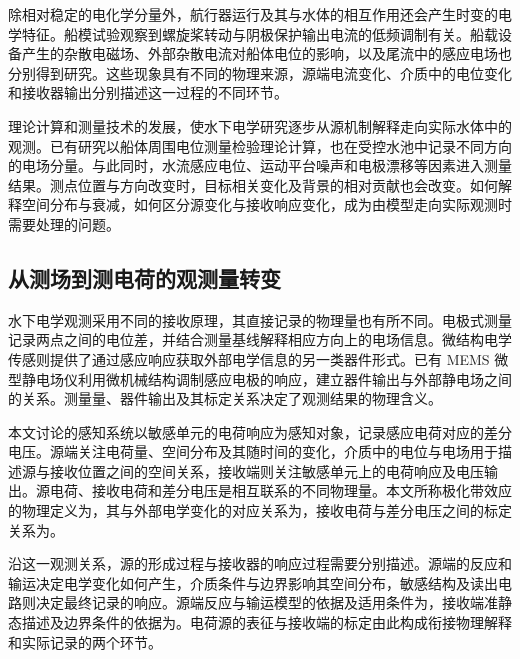除相对稳定的电化学分量外，航行器运行及其与水体的相互作用还会产生时变的电学特征。船模试验观察到螺旋桨转动与阴极保护输出电流的低频调制有关\cite{akomah2002}。船载设备产生的杂散电磁场、外部杂散电流对船体电位的影响，以及尾流中的感应电场也分别得到研究\cite{yang2006,wang2017stray,chen2024wake}。这些现象具有不同的物理来源，源端电流变化、介质中的电位变化和接收器输出分别描述这一过程的不同环节。

理论计算和测量技术的发展，使水下电学研究逐步从源机制解释走向实际水体中的观测。已有研究以船体周围电位测量检验理论计算，也在受控水池中记录不同方向的电场分量\cite{zamani1988,jiang2024}。与此同时，水流感应电位、运动平台噪声和电极漂移等因素进入测量结果\cite{crona2001,liu2022motion,wang2025agcl}。测点位置与方向改变时，目标相关变化及背景的相对贡献也会改变。如何解释空间分布与衰减，如何区分源变化与接收响应变化，成为由模型走向实际观测时需要处理的问题。

\subsection{从测场到测电荷的观测量转变}

水下电学观测采用不同的接收原理，其直接记录的物理量也有所不同。电极式测量记录两点之间的电位差，并结合测量基线解释相应方向上的电场信息\cite{jiang2024}。微结构电学传感则提供了通过感应响应获取外部电学信息的另一类器件形式。已有 MEMS 微型静电场仪利用微机械结构调制感应电极的响应，建立器件输出与外部静电场之间的关系\cite{horenstein2001mems}。测量量、器件输出及其标定关系决定了观测结果的物理含义。

本文讨论的感知系统以敏感单元的电荷响应为感知对象，记录感应电荷对应的差分电压。源端关注电荷量、空间分布及其随时间的变化，介质中的电位与电场用于描述源与接收位置之间的空间关系，接收端则关注敏感单元上的电荷响应及电压输出。源电荷、接收电荷和差分电压是相互联系的不同物理量。本文所称极化带效应的物理定义为\underline{\hspace{6em}}，其与外部电学变化的对应关系为\underline{\hspace{6em}}，接收电荷与差分电压之间的标定关系为\underline{\hspace{6em}}。

沿这一观测关系，源的形成过程与接收器的响应过程需要分别描述。源端的反应和输运决定电学变化如何产生，介质条件与边界影响其空间分布，敏感结构及读出电路则决定最终记录的响应。源端反应与输运模型的依据及适用条件为\underline{\hspace{6em}}，接收端准静态描述及边界条件的依据为\underline{\hspace{6em}}。电荷源的表征与接收端的标定由此构成衔接物理解释和实际记录的两个环节。

